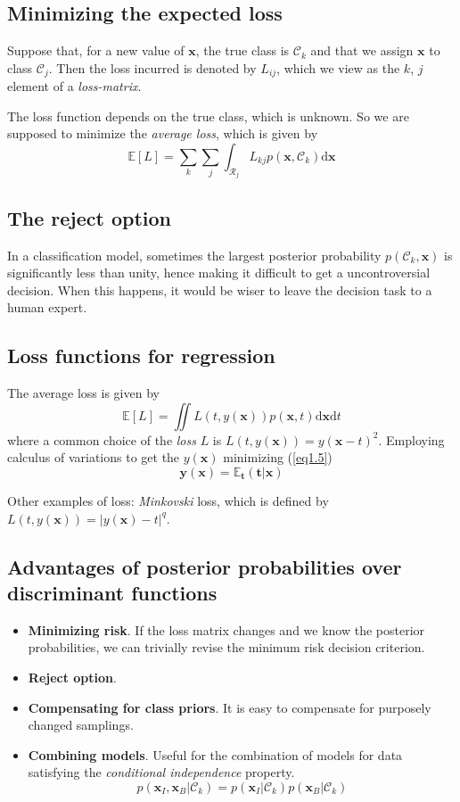 \documentclass[a4paper]{report}
\newcommand{\ud}{\mathrm{d}}
\renewcommand{\bf}{\mathbf}
\renewcommand{\cal}{\mathcal}
\newcommand{\bb}{\mathbb}
\newcommand{\imp}[1]{{\color{blue}\textit{#1}}}
\begin{document}
\subsection{Minimizing the expected loss}
Suppose that, for a new value of $\bf{x}$, the true class is $\cal{C}_k$ and that we assign $\bf{x}$ to class $\cal{C}_j$. Then the loss incurred is denoted by $L_{ij}$, which we view as the $k$, $j$ element of a \imp{loss-matrix}.

The loss function depends on the true class, which is unknown. So we are supposed to minimize the \textit{average loss}, which is given by
\begin{equation}
	\bb{E}[L]=\sum_k \sum_j \int_{\cal{R}_j} L_{kj} p(\bf{x},\cal{C}_k)\ud \bf{x}
\end{equation}

\subsection{The reject option}
In a classification model, sometimes the largest posterior probability $p(\cal{C}_k,\bf{x})$ is significantly less than unity, hence making it difficult to get a uncontroversial decision. When this happens, it would be wiser to leave the decision task to a human expert.
\subsection{Loss functions for regression}
The average loss is given by
\begin{equation}
	\bb{E}[L] = \iint L(t,y(\bf{x}))p(\bf{x},t)\ud \bf{x} \ud t \label{eq1.5}
\end{equation}
where a common choice of the \imp{loss} $L$ is $L(t,y(\bf{x}))={y(\bf{x}-t)}^2$. Employing calculus of variations to get the $y(\bf{x})$ minimizing (\ref{eq1.5})
\begin{equation}
	\bf{y}(\bf{x}) = \bb{E}_{\bf{t}}(\bf{t}|\bf{x})
\end{equation}

Other examples of loss: \imp{Minkovski} loss, which is defined by $L(t,y(\bf{x}))=|y(\bf{x})-t|^q$.
\subsection{Advantages of posterior probabilities over discriminant functions}
\begin{itemize}
\item \textbf{Minimizing risk}. If the loss matrix changes and we know the posterior probabilities, we can trivially revise the minimum risk decision criterion.\\
\item \textbf{Reject option}.\\
\item \textbf{Compensating for class priors}. It is easy to compensate for purposely changed samplings.\\
\item \textbf{Combining models}. Useful for the combination of models for data satisfying the \textit{conditional independence} property.
\[
p(\bf{x}_I,\bf{x}_B|\cal{C}_k)=p(\bf{x}_I|\cal{C}_k)p(\bf{x}_B|\cal{C}_k)
\]
\end{itemize}
\end{document}
